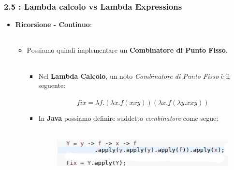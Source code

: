 \documentclass{beamer}
\begin{document}
\begin{frame}
	\frametitle{\textbf{2.5 : Lambda calcolo vs Lambda Expressions}}
	\begin{itemize}
		\item
			\textbf{Ricorsione - Continuo}:\\\
			\begin{itemize}
				\item 
					Possiamo quindi implementare un \textbf{Combinatore di Punto Fisso}.\\\
				\begin{itemize}
					\item
						Nel \textbf{Lambda Calcolo}, un noto \textit{Combinatore di Punto Fisso} è il seguente:\\\
							\[
								fix = \lambda f.(\lambda x.f(xxy))(\lambda x.f(\lambda y.xxy))
							\]
					\item
						In \textbf{Java} possiamo definire suddetto \textit{combinatore} come segue:\\\
							\begin{figure}
								\centering
								\includegraphics[width=0.8\linewidth]{image/fix.png}
								\label{fig:identity}
							\end{figure}
				\end{itemize}
			\end{itemize}
	\end{itemize}
\end{frame}

\end{document}
